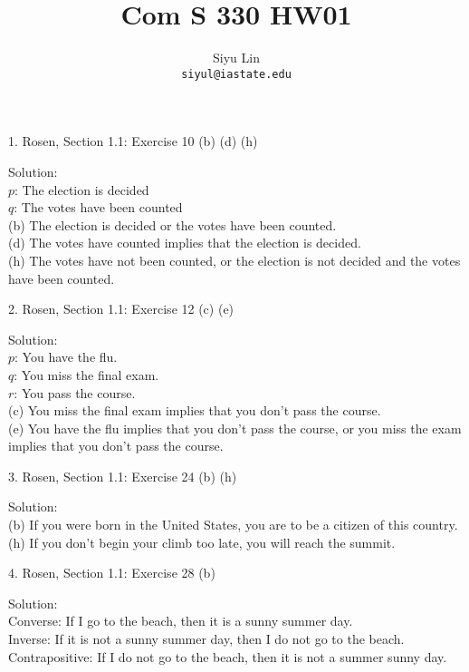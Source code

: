 \documentclass[12pt]{article}
\title{Com S 330 HW01}
\author{Siyu Lin \\ \texttt{siyul@iastate.edu}}
\begin{document}
\maketitle

1. Rosen, Section 1.1: Exercise 10 (b) (d) (h)

\indent Solution:\\
\indent $p$: The election is decided\\
\indent $q$: The votes have been counted\\
\indent (b) The election is decided or the votes have been counted.\\
\indent (d) The votes have counted implies that the election is decided.\\
\indent (h) The votes have not been counted, or the election is not decided and the votes have been counted.\\
\newline

2. Rosen, Section 1.1: Exercise 12 (c) (e)

\indent Solution:\\
\indent $p$: You have the flu.\\
\indent $q$: You miss the final exam.\\
\indent $r$: You pass the course.\\
\indent (c) You miss the final exam implies that you don't pass the course.\\
\indent (e) You have the flu implies that you don't pass the course, or you miss the exam implies that you don’t pass the course. \\
\newline

3. Rosen, Section 1.1: Exercise 24 (b) (h)

\indent Solution:\\
\indent (b) If you were born in the United States, you are to be a citizen of this country.\\
\indent (h) If you don’t begin your climb too late, you will reach the summit.\\
\newline

4. Rosen, Section 1.1: Exercise 28 (b)

\indent Solution:\\
\indent Converse: If I go to the beach, then it is a sunny summer day.\\
\indent Inverse: If it is not a sunny summer day, then I do not go to the beach.\\
\indent Contrapositive: If I do not go to the beach, then it is not a summer sunny day.\\
\newline
\end{document}
